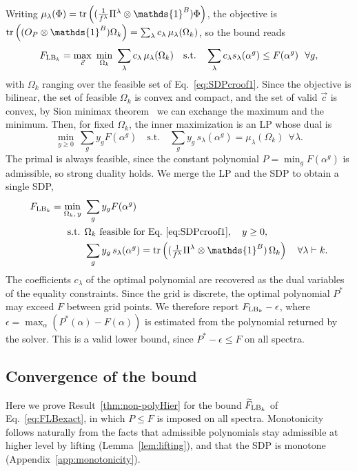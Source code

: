 \documentclass[aps,pra,twocolumn,superscriptaddress]{revtex4-2}
\newcommand{\one}{\mathds{1}}
\newcommand{\I}{\one}
\renewcommand{\a}{\alpha}
\begin{document}
\begin{widetext}
Writing $\mu_\lambda(\Phi)=\tr\left((\tfrac{1}{f^\lambda}\Pi^\lambda\otimes\I^B)\Phi\right)$, the objective is $\tr\left((O_P\otimes\I^B)\Omega_k\right)=\sum_\lambda c_\lambda\,\mu_\lambda(\Omega_k)$, so the bound reads
\begin{equation}
    F_{{\rm LB}_k}=\max_{\vec c}\ \min_{\Omega_k}\ \sum_\lambda c_\lambda\,\mu_\lambda(\Omega_k)
    \quad\text{s.t.}\quad \sum_\lambda c_\lambda s_\lambda(\a^g)\leq F(\a^g)\ \ \forall g,
\end{equation}
with $\Omega_k$ ranging over the feasible set of Eq.~\eqref{eq:SDPcroof1}. Since the objective is bilinear, the set of feasible $\Omega_k$ is convex and compact, and the set of valid $\vec{c}$ is convex, by Sion minimax theorem~\cite{Sion1958} we can exchange the maximum and the minimum. Then, for fixed $\Omega_k$, the inner maximization is an LP whose dual is
\begin{equation}
    \min_{y\geq0}\ \sum_g y_g F(\a^g)\quad\text{s.t.}\quad \sum_g y_g\,s_\lambda(\a^g)=\mu_\lambda(\Omega_k)\ \ \forall\lambda .
\end{equation}
The primal is always feasible, since the constant polynomial $P=\min_g F(\a^g)$ is admissible, so strong duality holds. We merge the LP and the SDP to obtain a single SDP,
\begin{align}
    F_{{\rm LB}_k}=\min_{\Omega_k,\,y}\ & \sum_g y_g F(\a^g)\\
    \text{s.t. }& \Omega_k\ \text{feasible for Eq.~\eqref{eq:SDPcroof1}},\quad y\geq0, \nonumber\\
    & \sum_g y_g\,s_\lambda(\a^g)=\tr\left((\tfrac{1}{f^\lambda}\Pi^\lambda\otimes\I^B)\,\Omega_k\right)\quad\forall\lambda\vdash k. \nonumber
\end{align}
The coefficients $c_\lambda$ of the optimal polynomial are recovered as the dual variables of the equality constraints. Since the grid is discrete, the optimal polynomial $P^*$ may exceed $F$ between grid points. We therefore report $F_{{\rm LB}_k}-\epsilon$, where $\epsilon=\max_\a\left(P^*(\a)-F(\a)\right)$ is estimated from the polynomial returned by the solver. This is a valid lower bound, since $P^*-\epsilon\leq F$ on all spectra.

\subsection{Convergence of the bound}\label{app:LPconvergence}
Here we prove Result~\ref{thm:non-polyHier} for the bound $\widetilde F_{{\rm LB}_k}$ of Eq.~\eqref{eq:FLBexact}, in which $P\leq F$ is imposed on all spectra. Monotonicity follows naturally from the facts that admissible polynomials stay admissible at higher level by lifting (Lemma~\ref{lem:lifting}), and that the SDP is monotone (Appendix~\ref{app:monotonicity}).


\end{widetext}
\end{document}
